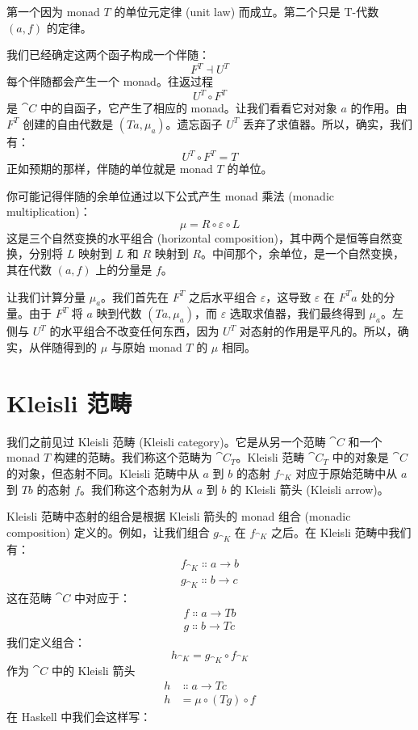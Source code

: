 \noindent
第一个因为 monad $T$ 的单位元定律 (unit law) 而成立。第二个只是 T-代数 $(a, f)$ 的定律。

我们已经确定这两个函子构成一个伴随：
\[F^T \dashv U^T\]
每个伴随都会产生一个 monad。往返过程
\[U^T \circ F^T\]
是 $\cat{C}$ 中的自函子，它产生了相应的 monad。让我们看看它对对象 $a$ 的作用。由 $F^T$ 创建的自由代数是 $(T a, \mu_a)$。遗忘函子 $U^T$ 丢弃了求值器。所以，确实，我们有：
\[U^T \circ F^T = T\]
正如预期的那样，伴随的单位就是 monad $T$ 的单位。

你可能记得伴随的余单位通过以下公式产生 monad 乘法 (monadic multiplication)：
\[\mu = R \circ \varepsilon \circ L\]
这是三个自然变换的水平组合 (horizontal composition)，其中两个是恒等自然变换，分别将 $L$ 映射到 $L$ 和 $R$ 映射到 $R$。中间那个，余单位，是一个自然变换，其在代数 $(a, f)$ 上的分量是 $f$。

让我们计算分量 $\mu_a$。我们首先在 $F^T$ 之后水平组合 $\varepsilon$，这导致 $\varepsilon$ 在 $F^T a$ 处的分量。由于 $F^T$ 将 $a$ 映到代数 $(T a, \mu_a)$，而 $\varepsilon$ 选取求值器，我们最终得到 $\mu_a$。左侧与 $U^T$ 的水平组合不改变任何东西，因为 $U^T$ 对态射的作用是平凡的。所以，确实，从伴随得到的 $\mu$ 与原始 monad $T$ 的 $\mu$ 相同。

\section{Kleisli 范畴}

我们之前见过 Kleisli 范畴 (Kleisli category)。它是从另一个范畴 $\cat{C}$ 和一个 monad $T$ 构建的范畴。我们称这个范畴为 $\cat{C}_T$。Kleisli 范畴 $\cat{C}_T$ 中的对象是 $\cat{C}$ 的对象，但态射不同。Kleisli 范畴中从 $a$ 到 $b$ 的态射 $f_{\cat{K}}$ 对应于原始范畴中从 $a$ 到 $T b$ 的态射 $f$。我们称这个态射为从 $a$ 到 $b$ 的 Kleisli 箭头 (Kleisli arrow)。

Kleisli 范畴中态射的组合是根据 Kleisli 箭头的 monad 组合 (monadic composition) 定义的。例如，让我们组合 $g_{\cat{K}}$ 在 $f_{\cat{K}}$ 之后。在 Kleisli 范畴中我们有：
\begin{gather*}
  f_{\cat{K}} \Colon a \to b \\
  g_{\cat{K}} \Colon b \to c
\end{gather*}
这在范畴 $\cat{C}$ 中对应于：
\begin{gather*}
  f \Colon a \to T b \\
  g \Colon b \to T c
\end{gather*}
我们定义组合：
\[h_{\cat{K}} = g_{\cat{K}} \circ f_{\cat{K}}\]
作为 $\cat{C}$ 中的 Kleisli 箭头
\begin{align*}
  h & \Colon a \to T c          \\
  h & = \mu \circ (T g) \circ f
\end{align*}
在 Haskell 中我们会这样写：


